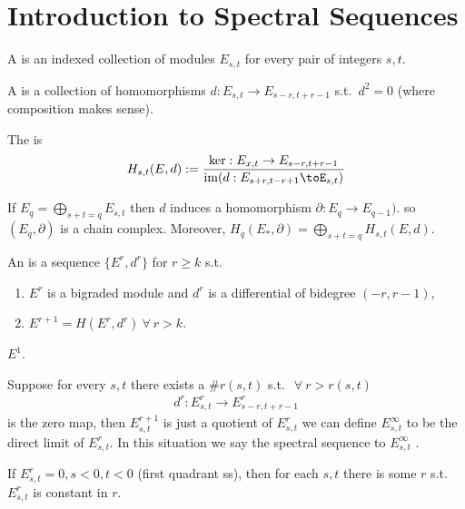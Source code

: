 \documentclass[12pt,class=article,crop=false]{standalone}
\begin{document}
\section{Introduction to Spectral Sequences}

\begin{defn}
A  is an indexed collection of modules $ E_{s,t}$ for every pair of integers  $ s,t$.

A    is a collection of homomorphisms $ d: E_{s,t} \to E_{s-r,t+r-1}$ s.t.\ $ d^2 = 0$ (where composition makes sense).

The  is
\begin{align*}
	H_{s,t}(E,d) : = \frac{ \ker :E_{x,t} \to E_{s-r,t+r-1}}{ \im (d: E_{s+r,t-r+1} \toE_{s,t})}
\end{align*}
\end{defn}
If $ E_q = \bigoplus_{ s+t=q} E_{s,t}$ then $ d$ induces a homomorphism  $ \partial :E_q \to E_{q-1}).$ so $ (E_q, \partial )$ is a chain complex. Moreover, $ H_q(E_*, \partial ) = \bigoplus_{ s+t=q} H_{s,t}(E,d) $.
\begin{defn}
An   is a sequence $ \{E^{r},d^{r}\} $  for $ r \geq k$  s.t.\ 
\begin{enumerate}[label=(\alph*)]
	\item $ E^{r}$ is a bigraded module and $ d^{r}$ is a differential of bidegree $ (-r,r-1)$,
	\item  $ E^{r+1} = H(E^{r},d^{r}) \ \forall \ r>k$.
\end{enumerate}
\end{defn}

\begin{eg}
$ E^{1}$.
\end{eg}

\begin{defn}
Suppose for every $ s,t$ there exists a  $ \# r(s,t)$  s.t.\ $ \ \forall \ r > r(s,t)$
\begin{align*}
	d^{r}:E_{s,t}^{r} \to E_{s-r,t+r-1}^{r}
\end{align*}
is the zero map, then $ E_{s,t}^{r+1}$ is just a quotient of $ E_{s,t}^{r}$ we can define $ E_{s,t}^{\infty}$ to be the direct limit of $ E_{s,t}^{r}$. In this situation we say the spectral sequence  to $ E_{s,t}^{\infty}$ .
\end{defn} 
\begin{remark}
If $ E_{s,t}^{r} = 0, s<0,t<0$ (first quadrant ss), then for each $ s,t$ there is some  $ r$  s.t.\ $ E_{s,t}^{r}$ is constant in $ r$.
\end{remark}
\end{document}
